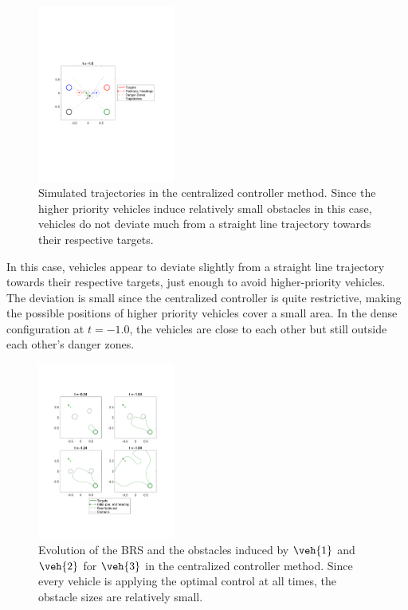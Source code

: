 \begin{figure}
  \centering
  \includegraphics[width=0.40\textwidth]{"fig/cc_traj"}
  \caption{Simulated trajectories in the centralized controller method. Since the higher priority vehicles induce relatively small obstacles in this case, vehicles do not deviate much from a straight line trajectory towards their respective targets.}
  \label{fig:cc_traj}
\end{figure}

In this case, vehicles appear to deviate slightly from a straight line trajectory towards their respective targets, just enough to avoid higher-priority vehicles. The deviation is small since the centralized controller is quite restrictive, making the possible positions of higher priority vehicles cover a small area. In the dense configuration at $t=-1.0$, the vehicles are close to each other but still outside each other's danger zones.

\begin{figure}
  \centering
  \includegraphics[width=0.40\textwidth]{"fig/cc_rs3"}
  \caption{Evolution of the BRS and the obstacles induced by $\veh{1}$ and $\veh{2}$ for $\veh{3}$ in the centralized controller method. Since every vehicle is applying the optimal control at all times, the obstacle sizes are relatively small.}
  \label{fig:cc_rs3}
\end{figure}

